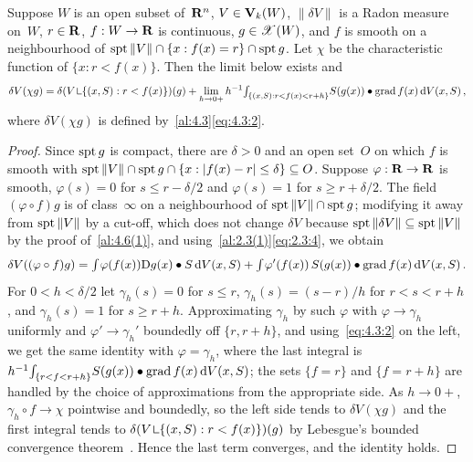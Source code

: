 \begin{lemma}
    \label{al:4.10(1)}
    Suppose $W$ is an open subset of~$\mathbf{R}^{n}$, $V \in \mathbf{V}_{k}(W)$, $\|\delta V\|$ is a
    Radon measure on~$W$, $r \in \mathbf{R}$, $f : W \to \mathbf{R}$ is continuous, $g \in \mathscr{X}(W)$, and $f$ is
    smooth on a neighbourhood of $\operatorname{spt} \|V\| \cap \{ x : f(x) = r \} \cap \operatorname{spt} g$. Let $\chi$ be
    the characteristic function of $\{ x : r < f(x) \}$. Then the limit below exists and
    \begin{displaymath}
        \delta V(\chi g) = \delta(V \restrict \{ (x,S) : r < f(x) \})(g) + \lim_{h \to 0+} h^{-1}
        \textint{\{ (x,S) : r < f(x) < r+h \}}{} S(g(x)) \bullet \grad f(x) \ud V(x,S) \,,
    \end{displaymath}
    where $\delta V(\chi g)$ is defined by~\ref{al:4.3}\eqref{eq:4.3:2}.
\end{lemma}

\begin{proof}
    Since $\operatorname{spt} g$ is compact, there are $\delta > 0$ and an open set~$O$ on which $f$ is smooth
    with $\operatorname{spt} \|V\| \cap \operatorname{spt} g \cap \{ x : |f(x) - r| \le \delta \} \subseteq O$. Suppose
    $\varphi : \mathbf{R} \to \mathbf{R}$ is smooth, $\varphi(s) = 0$ for $s \le r - \delta/2$ and $\varphi(s) =
    1$ for $s \ge r + \delta/2$. The field $(\varphi \circ f) g$ is of class~$\infty$ on a
    neighbourhood of $\operatorname{spt} \|V\| \cap \operatorname{spt} g$; modifying it away from $\operatorname{spt} \|V\|$ by a cut-off,
    which does not change $\delta V$ because $\operatorname{spt} \|\delta V\| \subseteq \operatorname{spt} \|V\|$
    by the proof of~\ref{al:4.6(1)}, and using~\ref{al:2.3(1)}\eqref{eq:2.3:4}, we obtain
    \begin{displaymath}
        \delta V((\varphi \circ f) g) = {\textstyle\int_{}^{}} \varphi(f(x)) \mathrm{D} g(x) \bullet S \,\mathrm{d} V(x,S) +
        {\textstyle\int_{}^{}} \varphi'(f(x)) \, S(g(x)) \bullet \operatorname{grad} f(x) \,\mathrm{d} V(x,S) \,.
    \end{displaymath}
    For $0 < h < \delta/2$ let $\gamma_h(s) = 0$ for $s \le r$, $\gamma_h(s) = (s-r)/h$ for $r <
    s < r + h$, and $\gamma_h(s) = 1$ for $s \ge r + h$. Approximating $\gamma_h$ by such
    $\varphi$ with $\varphi \to \gamma_h$ uniformly and $\varphi' \to \gamma_h'$ boundedly off $\{
    r, r+h \}$, and using~\eqref{eq:4.3:2} on the left, we get the same identity with $\varphi =
    \gamma_h$, where the last integral is $h^{-1} {\textstyle\int_{\{ r < f < r+h \}}^{}} S(g(x)) \bullet
    \operatorname{grad} f(x) \,\mathrm{d} V(x,S)$; the sets $\{ f = r \}$ and $\{ f = r + h \}$ are handled by the
    choice of approximations from the appropriate side. As $h \to 0+$, $\gamma_h \circ f \to
    \chi$ pointwise and boundedly, so the left side tends to $\delta V(\chi g)$ and the first
    integral tends to $\delta(V \restrict \{ (x,S) : r < f(x) \})(g)$ by Lebesgue's bounded
    convergence theorem~\cite[2.4.9]{Federer1969}. Hence the last term converges, and the
    identity holds.
\end{proof}

